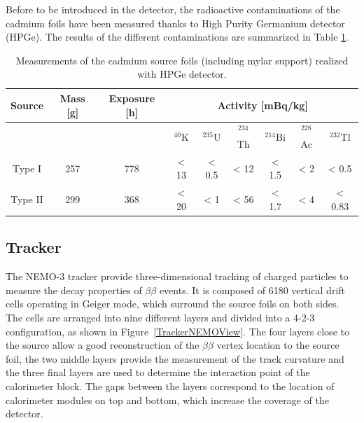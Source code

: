 \documentclass[main.tex]{subfiles}
\begin{document}
\NI Before to be introduced in the detector, the radioactive contaminations of the cadmium foils have been measured thanks to High Purity Germanium detector (HPGe). The results of the different contaminations are summarized in Table \ref{TableContaminationMeasurements}.


\bigskip


\begin{table}[h!]
\begin{center}
\begin{tabular}{c|c|c|c|c|c|c|c|c}
   \toprule
   Source  & Mass [g] & Exposure [h] &\multicolumn{6}{c|}{Activity [mBq/kg]} \\
   \midrule[0.05cm]
           &          &              & $^{\text{40}}$K &  $^{\text{235}}$U &  $^{\text{234}}$Th & $^{\text{214}}$Bi  & $^{\text{228}}$Ac & $^{\text{232}}$Tl \\[0.1cm]
   Type I  & 257      & 778          & < 13     & < 0.5      & < 12        & < 1.5                  & < 2        & < 0.5 \\
   Type II & 299      & 368          & < 20     & < 1        & < 56        & < 1.7                  & < 4        & < 0.83 \\
   \bottomrule
\end{tabular}
\caption{Measurements of the cadmium source foils (including mylar support) realized with HPGe detector.}
\label{TableContaminationMeasurements}
\end{center}
\end{table}


\FloatBarrier


\subsection{Tracker}


\NI The NEMO-3 tracker provide three-dimensional tracking of charged particles to measure the decay properties of $\beta\beta$ events. It is composed of 6180 vertical drift cells operating in Geiger mode, which surround the source foils on both sides. The cells are arranged into nine different layers and divided into a 4-2-3 configuration, as shown in Figure~\ref{TrackerNEMOView}. The four layers close to the source allow a good reconstruction of the $\beta\beta$ vertex location to the source foil, the two middle layers provide the measurement of the track curvature and the three final layers are used to determine the interaction point of the calorimeter block. The gaps between the layers correspond to the location of calorimeter modules on top and bottom, which increase the coverage of the detector.
\end{document}
